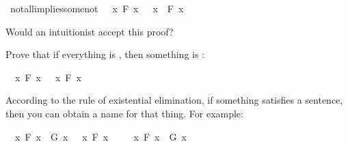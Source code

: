 \begin{isabellebody}
\begin{isamarkuptext}
\end{isamarkuptext}\isamarkuptrue%
\isamarkupfalse%
\ not{\isacharunderscore}all{\isacharunderscore}implies{\isacharunderscore}some{\isacharunderscore}not{\isacharcolon}\ {\isachardoublequoteopen}{\isasymnot}\ {\isacharparenleft}{\isasymforall}\ x{\isachardot}\ F\ x{\isacharparenright}\ {\isasymlongrightarrow}\ {\isacharparenleft}{\isasymexists}\ x{\isachardot}\ {\isasymnot}\ F\ x{\isacharparenright}{\isachardoublequoteclose}%
\isadelimproof
\ %
\endisadelimproof
%
\isatagproof
{}\isamarkupfalse%
%
\endisatagproof
{\isafoldproof}%
%
\isadelimproof
%
\endisadelimproof
%
\begin{isamarkuptext}%
Would an intuitionist accept this proof?%
\end{isamarkuptext}\isamarkuptrue%
%
\begin{isamarkuptext}%
\begin{Exercise} Prove that if everything is , then something is : \end{Exercise}%
\end{isamarkuptext}\isamarkuptrue%
\isamarkupfalse%
\ {\isachardoublequoteopen}{\isacharparenleft}{\isasymforall}\ x{\isachardot}\ F\ x{\isacharparenright}\ {\isasymlongrightarrow}\ {\isacharparenleft}{\isasymexists}\ x{\isachardot}\ F\ x{\isacharparenright}{\isachardoublequoteclose}%
\isadelimproof
\ %
\endisadelimproof
%
\isatagproof
{}\isamarkupfalse%
%
\endisatagproof
{\isafoldproof}%
%
\isadelimproof
%
\endisadelimproof
%
\isadelimdocument
%
\endisadelimdocument
%
\isatagdocument
%
\isamarkuptrue%
%
\endisatagdocument
{\isafolddocument}%
%
\isadelimdocument
%
\endisadelimdocument
%
\begin{isamarkuptext}%
According to the rule of existential elimination, if something satisfies a sentence, then
you can obtain a name for that thing. For example:%
\end{isamarkuptext}\isamarkuptrue%
\isamarkupfalse%
\ {\isachardoublequoteopen}{\isacharparenleft}{\isasymexists}\ x{\isachardot}\ F\ x\ {\isasymand}\ G\ x{\isacharparenright}\ {\isasymlongrightarrow}\ {\isacharparenleft}{\isasymexists}\ x{\isachardot}\ F\ x{\isacharparenright}{\isachardoublequoteclose}\isanewline
%
\isadelimproof
%
\endisadelimproof
%
\isatagproof
{}\isamarkupfalse%
\isanewline
\ \ \isamarkupfalse%
\ {\isachardoublequoteopen}{\isasymexists}\ x{\isachardot}\ F\ x\ {\isasymand}\ G\ x{\isachardoublequoteclose}\isanewline

\end{isabellebody}
